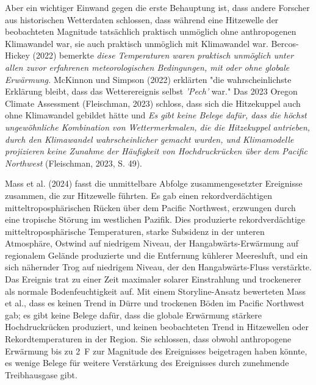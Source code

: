 \documentclass[12pt,paper=a4,DIV=12,parskip=never,chapterprefix=false,headings=standardclasses]{scrreprt}
\begin{document}
Aber ein wichtiger Einwand gegen die erste Behauptung ist, dass andere Forscher aus historischen Wetterdaten schlossen, dass während eine Hitzewelle der beobachteten Magnitude tatsächlich praktisch unmöglich ohne anthropogenen Klimawandel war, sie auch praktisch unmöglich mit Klimawandel war. Bercos-Hickey (2022) bemerkte \emph{diese Temperaturen waren praktisch unmöglich unter allen zuvor erfahrenen meteorologischen Bedingungen, mit oder ohne globale Erwärmung.} McKinnon und Simpson (2022) erklärten "die wahrscheinlichste Erklärung bleibt, dass das Wetterereignis selbst \emph{'Pech'} war." Das 2023 Oregon Climate Assessment (Fleischman, 2023) schloss, dass sich die Hitzekuppel auch ohne Klimawandel gebildet hätte und \emph{Es gibt keine Belege dafür, dass die höchst ungewöhnliche Kombination von Wettermerkmalen, die die Hitzekuppel antrieben, durch den Klimawandel wahrscheinlicher gemacht wurden, und Klimamodelle projizieren keine Zunahme der Häufigkeit von Hochdruckrücken über dem Pacific Northwest} (Fleischman, 2023, S. 49).

Mass et al. (2024) fasst die unmittelbare Abfolge zusammengesetzter Ereignisse zusammen, die zur Hitzewelle führten. Es gab einen rekordverdächtigen mitteltroposphärischen Rücken über dem Pacific Northwest, erzwungen durch eine tropische Störung im westlichen Pazifik. Dies produzierte rekordverdächtige mitteltroposphärische Temperaturen, starke Subsidenz in der unteren Atmosphäre, Ostwind auf niedrigem Niveau, der Hangabwärts-Erwärmung auf regionalem Gelände produzierte und die Entfernung kühlerer Meeresluft, und ein sich nähernder Trog auf niedrigem Niveau, der den Hangabwärts-Fluss verstärkte. Das Ereignis trat zu einer Zeit maximaler solarer Einstrahlung und trockenerer als normale Bodenfeuchtigkeit auf. Mit einem Storyline-Ansatz bewerteten Mass et al., dass es keinen Trend in Dürre und trockenen Böden im Pacific Northwest gab; es gibt keine Belege dafür, dass die globale Erwärmung stärkere Hochdruckrücken produziert, und keinen beobachteten Trend in Hitzewellen oder Rekordtemperaturen in der Region. Sie schlossen, dass obwohl anthropogene Erwärmung bis zu \SI{2}{F} zur Magnitude des Ereignisses beigetragen haben könnte, es wenige Belege für weitere Verstärkung des Ereignisses durch zunehmende Treibhausgase gibt.
\end{document}
